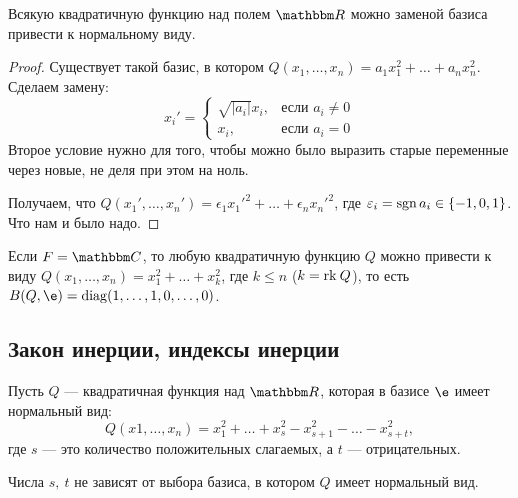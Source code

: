 \begin{Consequence}
Всякую квадратичную функцию над полем $\R$ можно заменой базиса привести к нормальному виду.
\end{Consequence}

\begin{proof}
Существует такой базис, в котором $Q(x_1, \ldots, x_n) = a_1x_1^2 + \ldots + a_nx_n^2$. Сделаем замену:
$$
x_i' = 
\begin{cases}
\sqrt{|a_i|}x_i, & \text{если } a_i \neq 0 \\
x_i, & \text{если } a_i = 0
\end{cases}
$$
Второе условие нужно для того, чтобы можно было выразить старые переменные через новые, не деля при этом на ноль.

Получаем, что $Q(x_1', \ldots, x_n') = \epsilon_1x_1'^2 + \ldots + \epsilon_nx_n'^2$, где $\varepsilon_i = \operatorname{\mathop{sgn}} a_i \in \{-1, 0, 1\}$. Что нам и было надо.
\end{proof}

\begin{Comment}
Если $F = \C$, то любую квадратичную функцию $Q$ можно привести к виду $Q(x_1, \ldots, x_n) = x_1^2 + \ldots + x_k^2$, где $k \leqslant n$ ($k = \mathrm{rk}\: Q$), то есть $B(Q, \e) = \diag(1, \ldots, 1, 0, \ldots, 0)$.
\end{Comment}

\subsection*{Закон инерции, индексы инерции}

Пусть $Q$ --- квадратичная функция над $\R$, которая в базисе $\e$ имеет нормальный вид: 
$$
Q(x1, \ldots, x_n) = x_1^2 + \ldots + x_s^2 - x_{s + 1}^2 - \ldots - x_{s + t}^2,
$$
где $s$ --- это количество положительных слагаемых, а $t$ --- отрицательных.

\begin{Theorem}
Числа $s,\ t$ не зависят от выбора базиса, в котором $Q$ имеет нормальный вид.
\end{Theorem}

